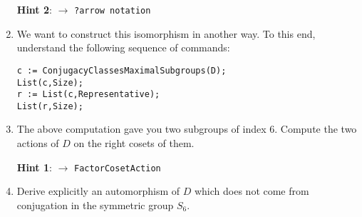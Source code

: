 \documentclass[12pt]{article}
\begin{document}
\begin{enumerate}
\smallskip
\textbf{Hint 2}: $\to$ \texttt{?arrow notation}
\item We want to construct this isomorphism in another way.
To this end, understand the following sequence of commands:

\begin{verbatim}
c := ConjugacyClassesMaximalSubgroups(D);
List(c,Size);
r := List(c,Representative);
List(r,Size);
\end{verbatim}
\item The above computation gave you two subgroups of index $6$.
Compute the two actions of $D$ on the right cosets of them.

\smallskip
\textbf{Hint 1}: $\to$ \texttt{FactorCosetAction}
\item Derive explicitly an automorphism of $D$ which does not
come from conjugation in the symmetric group $S_6$.

\end{enumerate}
\end{document}
